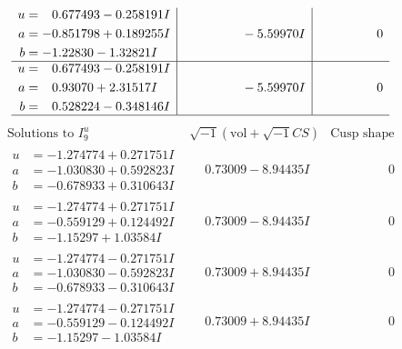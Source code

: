 \documentclass[1p]{elsarticle_modified}
\theoremstyle{definition}
\newcommand{\I}{\sqrt{-1}}
\begin{document}
$$\begin{array}{c|c|c}
\begin{aligned}
u &= \phantom{-}0.677493 - 0.258191 I \\
a &= -0.851798 + 0.189255 I \\
b &= -1.22830 - 1.32821 I\end{aligned}
 & \phantom{-0.000000 } -5.59970 I & \phantom{-0.000000 } 0 \\ \hline\begin{aligned}
u &= \phantom{-}0.677493 - 0.258191 I \\
a &= \phantom{-}0.93070 + 2.31517 I \\
b &= \phantom{-}0.528224 - 0.348146 I\end{aligned}
 & \phantom{-0.000000 } -5.59970 I & \phantom{-0.000000 } 0\\
 \hline 
 \end{array}$$\newpage$$\begin{array}{c|c|c}  
\text{Solutions to }I^u_{9}& \I (\text{vol} + \sqrt{-1}CS) & \text{Cusp shape}\\
 \hline 
\begin{aligned}
u &= -1.274774 + 0.271751 I \\
a &= -1.030830 + 0.592823 I \\
b &= -0.678933 + 0.310643 I\end{aligned}
 & \phantom{-}0.73009 - 8.94435 I & \phantom{-0.000000 } 0 \\ \hline\begin{aligned}
u &= -1.274774 + 0.271751 I \\
a &= -0.559129 + 0.124492 I \\
b &= -1.15297 + 1.03584 I\end{aligned}
 & \phantom{-}0.73009 - 8.94435 I & \phantom{-0.000000 } 0 \\ \hline\begin{aligned}
u &= -1.274774 - 0.271751 I \\
a &= -1.030830 - 0.592823 I \\
b &= -0.678933 - 0.310643 I\end{aligned}
 & \phantom{-}0.73009 + 8.94435 I & \phantom{-0.000000 } 0 \\ \hline\begin{aligned}
u &= -1.274774 - 0.271751 I \\
a &= -0.559129 - 0.124492 I \\
b &= -1.15297 - 1.03584 I\end{aligned}
 & \phantom{-}0.73009 + 8.94435 I & \phantom{-0.000000 } 0 \\ \hline\begin{aligned}

\end{aligned}
\end{array}$$
\end{document}

